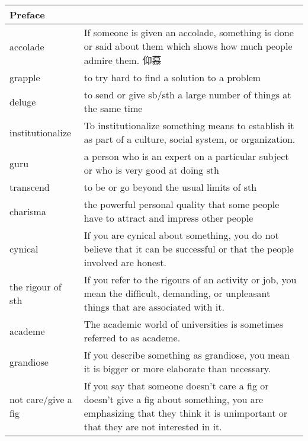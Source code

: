 \documentclass{article}
\begin{document}
\begin{center}
\begin{longtable}{|l|p{7cm}|}

\hline
\multicolumn{2}{|l|}{\textbf{Preface}}\\
\hline
accolade
&
If someone is given an accolade, something is done or said about them which shows how much people admire them. 仰慕
\\

\hline
grapple
&
to try hard to find a solution to a problem
\\

\hline
deluge
&
to send or give sb/sth a large number of things at the same time
\\

\hline
institutionalize
&
To institutionalize something means to establish it as part of a culture, social system, or organization.
\\

\hline
guru
&
a person who is an expert on a particular subject or who is very good at doing sth
\\

\hline
transcend
&
to be or go beyond the usual limits of sth
\\

\hline
charisma
&
the powerful personal quality that some people have to attract and impress other people
\\

\hline
cynical
&
If you are cynical about something, you do not believe that it can be successful or that the people involved are honest.
\\

\hline
the rigour of sth
&
If you refer to the rigours of an activity or job, you mean the difficult, demanding, or unpleasant things that are associated with it.
\\

\hline
academe
&
The academic world of universities is sometimes referred to as academe.
\\

\hline
grandiose
&
If you describe something as grandiose, you mean it is bigger or more elaborate than necessary.
\\

\hline
not care/give a fig
&
If you say that someone doesn't care a fig or doesn't give a fig about something, you are emphasizing that they think it is unimportant or that they are not interested in it.
\\


\end{longtable}
\end{center}
\end{document}
